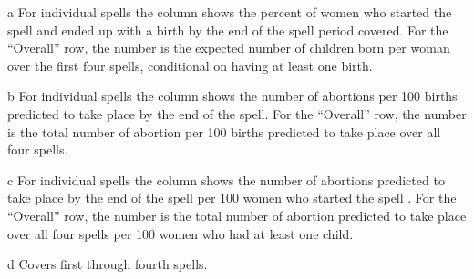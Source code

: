 \begin{table}[htbp]
\begin{center}
\begin{scriptsize}
\begin{threeparttable}
\begin{tablenotes}
\item[a] For individual spells the column shows the percent of women who started the
spell and ended up with a birth by the end of the spell period covered.
For the ``Overall'' row, the number is the expected number of children born per woman over 
the first four spells, conditional on having at least one birth.
\item[b] For individual spells the column shows the number of abortions per 100
births predicted to take place by the end of the spell.
For the ``Overall'' row, the number is the total number of abortion per 100 births 
predicted to take place over all four spells.
\item[c]  For individual spells the column shows the number of abortions 
predicted to take place by the end of the spell per 100 women who started the spell .
For the ``Overall'' row, the number is the total number of abortion 
predicted to take place over all four spells per 100 women who had at least one child.
\item[d] Covers first through fourth spells. 
\end{tablenotes}
\end{threeparttable}
\end{scriptsize}
\end{center}
\end{table}
